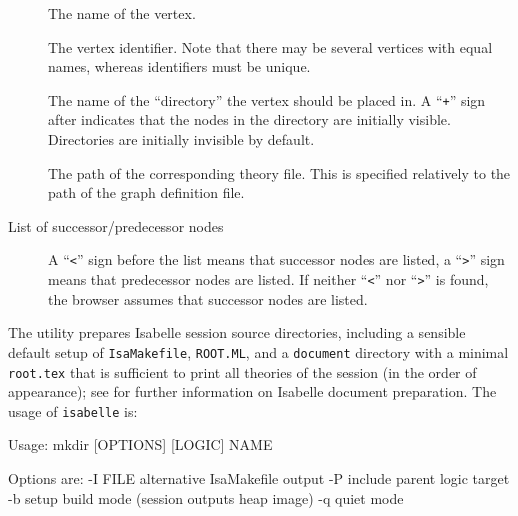\begin{isabellebody}
\begin{isamarkuptext}
\begin{description}
  \item[] The name of the vertex.
  
  \item[] The vertex identifier. Note that there may
  be several vertices with equal names, whereas identifiers must be
  unique.
  
  \item[] The name of the ``directory'' the vertex
  should be placed in.  A ``\verb|+|'' sign after  indicates that the nodes in the directory are initially
  visible. Directories are initially invisible by default.
  
  \item[] The path of the corresponding theory file. This
  is specified relatively to the path of the graph definition file.
  
  \item[List of successor/predecessor nodes] A ``\verb|<|''
  sign before the list means that successor nodes are listed, a
  ``\verb|>|'' sign means that predecessor nodes are listed. If
  neither ``\verb|<|'' nor ``\verb|>|'' is found, the
  browser assumes that successor nodes are listed.

  \end{description}%
\end{isamarkuptext}%
\isamarkuptrue%
%
\isamarkuptrue%
%
\begin{isamarkuptext}%
The \hypertarget{tool.mkdir}{\hyperlink{tool.mkdir}{\mbox{}}} utility prepares Isabelle session source
  directories, including a sensible default setup of \verb|IsaMakefile|, \verb|ROOT.ML|, and a \verb|document|
  directory with a minimal \verb|root.tex| that is sufficient to
  print all theories of the session (in the order of appearance); see
   for further information on Isabelle
  document preparation.  The usage of \verb|isabelle| \hyperlink{tool.mkdir}{\mbox{}} is:

\begin{ttbox}
Usage: mkdir [OPTIONS] [LOGIC] NAME

  Options are:
    -I FILE      alternative IsaMakefile output
    -P           include parent logic target
    -b           setup build mode (session outputs heap image)
    -q           quiet mode


\end{ttbox}
\end{isamarkuptext}
\end{isabellebody}
